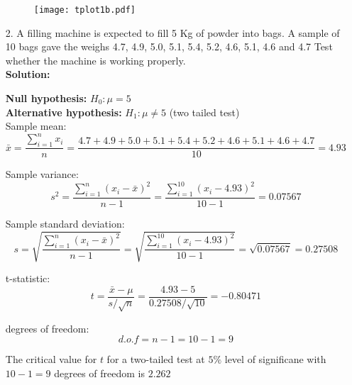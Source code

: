 \documentclass[a4paper,11pt,openright]{report}
\begin{document}
\begin{enumerate}
\vspace{0.5cm}



\begin{figure}[ht!]
\texttt{[image: tplot1b.pdf]}
\centering
\end{figure}

\vspace{1cm}

\item[2.] A filling machine is expected to fill 5 Kg of powder into bags. A sample of 10 
bags gave the weighs 4.7, 4.9, 5.0, 5.1, 5.4, 5.2, 4.6, 5.1, 4.6 and 4.7 Test whether the
machine is working properly. \\

\textbf{Solution:}

\textbf{Null hypothesis:} $H_{0}: \mu = 5$ \\
\textbf{Alternative hypothesis:} $H_{1}: \mu \neq 5$ \hspace{5px} (two tailed test) \\

Sample mean:
\begin{equation*}
\bar x =  \frac{\sum\limits_{i=1}^{n} x_{i}}{n} 
	= \frac{4.7 + 4.9 + 5.0 + 5.1 + 5.4 + 5.2 + 4.6 + 5.1 + 4.6 + 4.7}{10} 
	= 4.93
\end{equation*}

Sample variance:
\begin{equation*}
s^{2} = \frac{\sum\limits_{i=1}^{n} (x_{i} - \bar x)^{2}}{n - 1} 
	= \frac{\sum\limits_{i=1}^{10} (x_{i} - 4.93)^{2}}{10-1} 
	= 0.07567
\end{equation*}

Sample standard deviation:
\begin{equation*}
s = \sqrt{\frac{\sum\limits_{i=1}^{n} (x_{i} - \bar x)^{2}}{n - 1}}
= \sqrt{\frac{\sum\limits_{i=1}^{10} (x_{i} - 4.93)^{2}}{10 - 1}}
= \sqrt{0.07567} = 0.27508
\end{equation*}

t-statistic:
\begin{equation*}
t = \frac{\bar x - \mu}{s/\sqrt{n}} = \frac{4.93 - 5}{0.27508/\sqrt{10}} = -0.80471
\end{equation*}

degrees of freedom:
\begin{equation*}
d.o.f = n - 1 = 10 - 1 = 9
\end{equation*}

The critical value for $t$ for a two-tailed test at $5\%$ level of significane with $10 - 1 
= 9$ degrees of freedom is $2.262$ \\


\end{enumerate}
\end{document}
